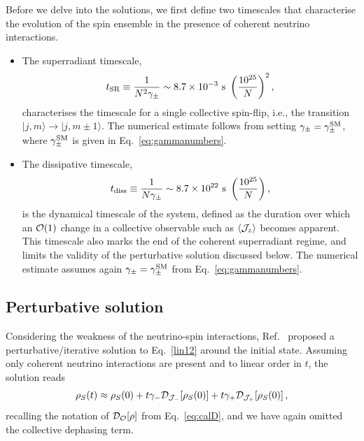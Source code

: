 \documentclass[aps,prd,10pt,twocolumn,superscriptaddress,floatfix,nofootinbib,amsmath,amssymb,altaffilletter,preprintnumbers]{revtex4-1}
\begin{document}
Before we delve into the solutions, we first define two timescales that characterise the evolution of the spin ensemble in the presence of coherent neutrino interactions.
\begin{itemize}
\item The superradiant timescale,
\begin{equation}
t_{\rm SR}\equiv \frac{1}{N^2\gamma_{\pm}}\sim 8.7\times 10^{-3}~{\rm s}~\left(\frac{10^{25}}{N}\right)^2, 
\end{equation} 
characterises the timescale for a single collective spin-flip, i.e., the transition $\vert j, m\rangle\to \vert j, m\pm1\rangle$. The numerical estimate follows from setting $\gamma_\pm=\gamma_\pm^{\rm SM}$, where $\gamma_\pm^{\rm SM}$ is given in Eq.~\eqref{eq:gammanumbers}. 

\item The dissipative timescale, 
\begin{equation}
t_{\rm diss}\equiv \frac{1}{N\gamma_{\pm}}\sim 8.7\times 10^{22}~{\rm s}~\left(\frac{10^{25}}{N}\right), 
\label{eq:tdiss}
\end{equation} 
is the dynamical timescale of the system, defined as the duration over which an ${\cal O}(1)$ change in a collective observable such as $\langle {\cal J}_z\rangle$ becomes apparent. This timescale also marks the end of the coherent superradiant regime, and limits the validity of the perturbative solution discussed below.  The numerical estimate assumes again $\gamma_\pm=\gamma_\pm^{\rm SM}$ from Eq.~\eqref{eq:gammanumbers}.

\end{itemize}




\subsection{Perturbative solution}


Considering the weakness of the neutrino-spin interactions, Ref.~\cite{Arvanitaki:2024taq} proposed a perturbative/iterative solution to Eq.~\eqref{lin12} around the initial state.  Assuming only coherent neutrino interactions are present and to linear order in $t$, the solution reads 
\begin{equation} 
\rho_S(t) \approx 
\rho_S(0)  +t\gamma_{-}{\cal D}_{{\cal J}_-}[\rho_S(0)] + t\gamma_{+}{\cal D}_{{\cal J}_+}[\rho_S(0)]\, ,
\label{eq:perturb} 
\end{equation} 
recalling the notation of ${\cal D}_{\cal O}[\rho]$ from Eq.~\eqref{eq:calD}, and we have again omitted the collective dephasing term.
\end{document}
